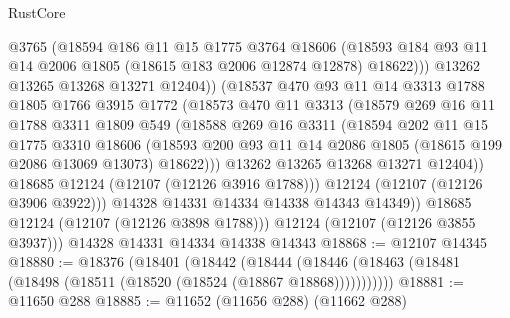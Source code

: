 \begin{lexlean}{RustCore}
\begin{coremodule}
                    @3765
                    (@18594
                      @186
                      @11
                      @15
                      @1775
                      @3764
                      @18606
                      (@18593
                        @184
                        @93
                        @11
                        @14
                        @2006
                        @1805
                        (@18615 @183 @2006 @12874 @12878)
                        @18622)))
                  @13262
                  @13265
                  @13268
                  @13271
                  @12404))
              (@18537
                @470
                @93
                @11
                @14
                @3313
                @1788
                @1805
                @1766
                @3915
                @1772
                (@18573
                  @470
                  @11
                  @3313
                  (@18579
                    @269
                    @16
                    @11
                    @1788
                    @3311
                    @1809
                    @549
                    (@18588
                      @269
                      @16
                      @3311
                      (@18594
                        @202
                        @11
                        @15
                        @1775
                        @3310
                        @18606
                        (@18593
                          @200
                          @93
                          @11
                          @14
                          @2086
                          @1805
                          (@18615 @199 @2086 @13069 @13073)
                          @18622)))
                    @13262
                    @13265
                    @13268
                    @13271
                    @12404))
                @18685
                @12124
                (@12107 (@12126 @3916 @1788)))
              @12124
              (@12107 (@12126 @3906 @3922)))
            @14328
            @14331
            @14334
            @14338
            @14343
            @14349))
        @18685
        @12124
        (@12107 (@12126 @3898 @1788)))
      @12124
      (@12107 (@12126 @3855 @3937)))
    @14328
    @14331
    @14334
    @14338
    @14343
@18868 := @12107 @14345
@18880 := @18376
    (@18401
      (@18442
        (@18444 (@18446 (@18463 (@18481 (@18498 (@18511 (@18520 (@18524 (@18867 @18868)))))))))))
@18881 := @11650 @288
@18885 := @11652 (@11656 @288) (@11662 @288)

\end{coremodule}
\end{lexlean}
